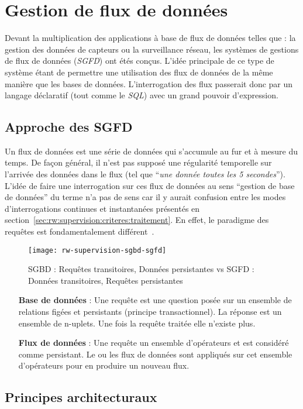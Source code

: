 \section{Gestion de flux de données}
Devant la multiplication des applications à base de flux de données telles que : la gestion des données de capteurs ou la surveillance réseau, les systèmes de gestions de flux de données (\textit{SGFD}) ont étés conçus. L'idée principale de ce type de système étant de permettre une utilisation des flux de données de la même manière que les bases de données. L'interrogation des flux passerait donc par un langage déclaratif (tout comme le \textit{SQL}) avec un grand pouvoir d'expression.
\subsection{Approche des SGFD}
Un flux de données est une série de données qui s'accumule au fur et à mesure du temps. De façon général, il n'est pas supposé une régularité temporelle sur l'arrivée des données dans le flux (tel que \enquote{\it une donnée toutes les 5 secondes}). L'idée de faire une interrogation sur ces flux de données au sens \enquote{gestion de base de données} du terme n'a pas de sens car il y aurait confusion entre les modes d'interrogations continues et instantanées présentés en section~\ref{sec:rw:supervision:criteres:traitement}. En effet, le paradigme des requêtes est fondamentalement différent~\cite{Gurgen:sstreamware}.
\begin{figure}[ht]
    \centering
    \texttt{[image: rw-supervision-sgbd-sgfd]}
    \caption{SGBD : Requêtes transitoires, Données persistantes vs SGFD : Données transitoires, Requêtes persistantes}
\end{figure}

\begin{itemize}
    \item[\textbf{Base de données}] : Une requête est une question posée sur un ensemble de relations figées et persistants (principe transactionnel). La réponse est un ensemble de n-uplets. Une fois la requête traitée elle n'existe plus.
    \item[\textbf{Flux de données}] : Une requête un ensemble d'opérateurs et est considéré comme persistant. Le ou les flux de données sont appliqués sur cet ensemble d'opérateurs pour en produire un nouveau flux.
\end{itemize}

\subsection{Principes architecturaux}
